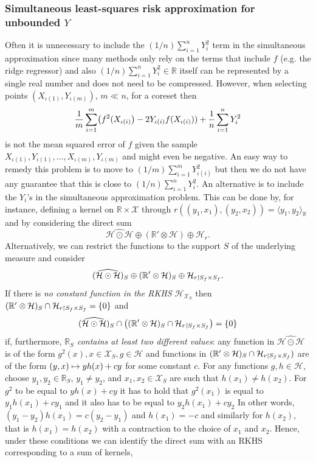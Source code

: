 \documentclass[AHL,Unicode,longabstracts,published]{cedram}
\theoremstyle{remark}
\newcommand{\R}{\mathbb{R}}
\newcommand{\dR}{{\R'}}
\newcommand{\X}{\mathcal{X}}
\newcommand{\cH}{\mathcal{H}}
\newcommand*{\mk}{\mkern -1mu}
\let\oldmapsto\mapsto
\renewcommand*{\mapsto}{\mathchoice{\longmapsto}{\oldmapsto}{\oldmapsto}{\oldmapsto}}
\let\originalleft\left
\let\originalright\right
\renewcommand{\left}{\mathopen{}\mathclose\bgroup\originalleft}
\renewcommand{\right}{\aftergroup\egroup\originalright}
\begin{document}
\subsubsection{Simultaneous least-squares risk approximation for unbounded \texorpdfstring{$Y$}{Y}} \label{sec:simult_risk}
Often it is unnecessary to include the $(1/n) \sum_{i=1}^n Y_i^2$ term in the simultaneous approximation since many methods only rely on the terms that include $f$ (e.g. the ridge regressor) and also $(1/n) \sum_{i=1}^n Y_i^2 \in \R$ itself can be represented by a single real number and does not need to be compressed. However, when selecting points $(X_{\iota(1)},Y_{\iota(m)})$, $m \ll n$, for a coreset then
\[
\frac{1}{m} \sum_{i=1}^m \left(f^2(X_{\iota(i)}\right) -2 Y_{\iota(i)} f(X_{\iota(i)})) + \frac{1}{n} \sum_{i=1}^n Y_i^2
\]
is not the mean squared error of $f$ given the sample $X_{\iota(1)},Y_{\iota(1)}, \dots,X_{\iota(m)},Y_{\iota(m)}$ and might even be negative. An easy way to remedy this problem is to move to $(1/m) \sum_{i=1}^m Y_{\iota(i)}^2$ but then we do not have any guarantee that this is close to $(1/n) \sum_{i=1}^n Y_i^2$. An alternative is to include the $Y_i$'s in the simultaneous approximation problem. This can be done by, for instance, defining a kernel on $\R \times \X$ through $r((y_1,x_1),(y_2,x_2)) = \langle y_1, y_2 \rangle_\R$ and by considering the direct sum
\[
\widehat{\cH \odot \cH} \oplus (\dR \otimes \cH) \oplus \cH_r.
\]
Alternatively, we can restrict the functions to the support $S$ of the underlying measure and consider
\[
(\widehat{\cH \odot \cH})_S \oplus (\dR \otimes \cH)_S \oplus \cH_{r\mk\upharpoonright\mk S_f \times S_f}.
\]
If there is \emph{no constant function in the RKHS $\cH_{\X_S}$} then $(\dR \otimes \cH)_S \cap \cH_{r\mk\upharpoonright S_f \times S_f} = \{0\}$ and
\[
(\widehat{\cH \odot \cH})_S \cap \left((\dR \otimes \cH)_S \cap \cH_{r\upharpoonright\mk S_f \times S_f}\right) =\{0\}
\]
if, furthermore, \emph{$\R_S$ contains at least two different values}: any function in $\widehat{\cH \odot \cH}$ is of the form $g^2(x), x \in \X_S, g\in \cH$ and functions in $(\dR \otimes \cH)_S \cap \cH_{r\mk\upharpoonright\mk S_f \times S_f})$ are of the form $(y,x) \mapsto y h(x) + c y$ for some constant $c$. For any functions $g,h\in \cH$, choose $y_1, y_2 \in \R_S$, $y_1 \not = y_2$, and $x_1, x_2 \in \X_S$ are such that $h(x_1) \not = h(x_2)$. For $g^2$ to be equal to $yh(x) +cy$ it has to hold that $g^2(x_1)$ is equal to $y_1 h(x_1) + c y_1$ and it also has to be equal to $y_2 h(x_1) + c y_2$ In other words, $ (y_1 - y_2) h(x_1) = c (y_2 - y_1)$ and $h(x_1) = -c$ and similarly for $h(x_2)$, that is $h(x_1) = h(x_2)$ with a contraction to the choice of $x_1$ and $x_2$. Hence, under these conditions we can identify the direct sum with an RKHS corresponding to a sum of kernels,
\end{document}
